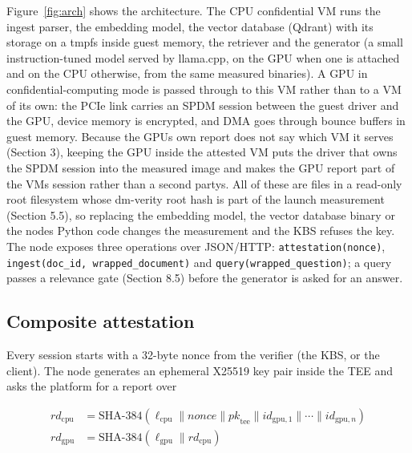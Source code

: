 \documentclass[letterpaper,twocolumn,10pt]{article}
\begin{document}
Figure~\ref{fig:arch} shows the architecture. The CPU confidential VM runs the ingest parser, the embedding model, the vector database (Qdrant) with its storage on a tmpfs inside guest memory, the retriever and the generator (a small instruction-tuned model served by llama.cpp, on the GPU when one is attached and on the CPU otherwise, from the same measured binaries). A GPU in confidential-computing mode is passed through to this VM rather than to a VM of its own: the PCIe link carries an SPDM session between the guest driver and the GPU, device memory is encrypted, and DMA goes through bounce buffers in guest memory. Because the GPU\textquotesingle s own report does not say which VM it serves (Section 3), keeping the GPU inside the attested VM puts the driver that owns the SPDM session into the measured image and makes the GPU report part of the VM\textquotesingle s session rather than a second party\textquotesingle s. All of these are files in a read-only root filesystem whose dm-verity root hash is part of the launch measurement (Section 5.5), so replacing the embedding model, the vector database binary or the node\textquotesingle s Python code changes the measurement and the KBS refuses the key. The node exposes three operations over JSON/HTTP: \texttt{attestation(nonce)}, \texttt{ingest(doc\_id,\ wrapped\_document)} and \texttt{query(wrapped\_question)}; a query passes a relevance gate (Section 8.5) before the generator is asked for an answer.

\subsection{Composite attestation}\label{composite-attestation}

Every session starts with a 32-byte nonce from the verifier (the KBS, or the client). The node generates an ephemeral X25519 key pair inside the TEE and asks the platform for a report over

\begin{footnotesize}
\begin{align*}
\mathit{rd}_{\mathrm{cpu}} &= \mathrm{SHA\text{-}384}(\ell_{\mathrm{cpu}} \parallel \mathit{nonce} \parallel \mathit{pk}_{\mathrm{tee}} \parallel \mathit{id}_{\mathrm{gpu},1} \parallel \cdots \parallel \mathit{id}_{\mathrm{gpu},n})\\
\mathit{rd}_{\mathrm{gpu}} &= \mathrm{SHA\text{-}384}(\ell_{\mathrm{gpu}} \parallel \mathit{rd}_{\mathrm{cpu}})
\end{align*}
\end{footnotesize}
\end{document}

